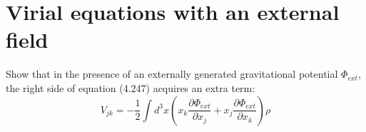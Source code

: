 \section{Virial equations with an external field}

Show that in the presence of an externally generated gravitational potential $\Phi_{ext}$,
the right side of equation (4.247) acquires an extra term:
\begin{equation}
    V_{jk}=-\frac{1}{2}\int d^3x\left(x_k\frac{\partial\Phi_{ext}}{\partial x_j}+x_j\frac{\partial\Phi_{ext}}{\partial x_k}\right)\rho
\end{equation}